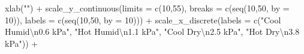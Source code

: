 \documentclass[
]{article}
\newenvironment{Shaded}{\begin{snugshade}}{\end{snugshade}}
\newcommand{\AttributeTok}[1]{\textcolor[rgb]{0.77,0.63,0.00}{#1}}
\newcommand{\DecValTok}[1]{\textcolor[rgb]{0.00,0.00,0.81}{#1}}
\newcommand{\FunctionTok}[1]{\textcolor[rgb]{0.00,0.00,0.00}{#1}}
\newcommand{\NormalTok}[1]{#1}
\newcommand{\SpecialCharTok}[1]{\textcolor[rgb]{0.00,0.00,0.00}{#1}}
\newcommand{\StringTok}[1]{\textcolor[rgb]{0.31,0.60,0.02}{#1}}
\begin{document}
\begin{Shaded}
\begin{Highlighting}[]
  \FunctionTok{xlab}\NormalTok{(}\StringTok{""}\NormalTok{) }\SpecialCharTok{+} 
  \FunctionTok{scale\_y\_continuous}\NormalTok{(}\AttributeTok{limits =} \FunctionTok{c}\NormalTok{(}\DecValTok{10}\NormalTok{,}\DecValTok{55}\NormalTok{),}
                     \AttributeTok{breaks =} \FunctionTok{c}\NormalTok{(}\FunctionTok{seq}\NormalTok{(}\DecValTok{10}\NormalTok{,}\DecValTok{50}\NormalTok{, }\AttributeTok{by =} \DecValTok{10}\NormalTok{)),}
                     \AttributeTok{labels =} \FunctionTok{c}\NormalTok{(}\FunctionTok{seq}\NormalTok{(}\DecValTok{10}\NormalTok{,}\DecValTok{50}\NormalTok{, }\AttributeTok{by =} \DecValTok{10}\NormalTok{))) }\SpecialCharTok{+}
  \FunctionTok{scale\_x\_discrete}\NormalTok{(}\AttributeTok{labels =} \FunctionTok{c}\NormalTok{(}\StringTok{"Cool Humid}\SpecialCharTok{\textbackslash{}n}\StringTok{0.6 kPa"}\NormalTok{,}
                               \StringTok{"Hot Humid}\SpecialCharTok{\textbackslash{}n}\StringTok{1.1 kPa"}\NormalTok{,}
                               \StringTok{"Cool Dry}\SpecialCharTok{\textbackslash{}n}\StringTok{2.5 kPa"}\NormalTok{,}
                               \StringTok{"Hot Dry}\SpecialCharTok{\textbackslash{}n}\StringTok{3.8 kPa"}\NormalTok{)) }\SpecialCharTok{+} 
  

\end{Highlighting}
\end{Shaded}
\end{document}
